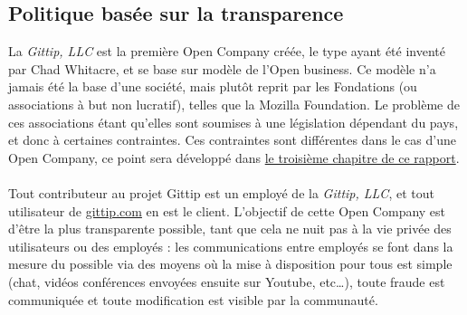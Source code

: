     \subsection{Politique basée sur la transparence}

La \emph{Gittip, LLC} est la première Open Company créée, le type ayant été
inventé par Chad Whitacre, et se base sur modèle de l'Open business. Ce modèle
n'a jamais été la base d'une société, mais plutôt reprit par les Fondations (ou
associations à but non lucratif), telles que la Mozilla Foundation. Le problème
de ces associations étant qu'elles sont soumises à une législation dépendant du
pays, et donc à certaines contraintes. Ces contraintes sont différentes dans le
cas d'une Open Company, ce point sera développé dans \hyperref[chapter3]{le
troisième chapitre de ce rapport}.

\paragraph{}
Tout contributeur au projet Gittip est un employé de la \emph{Gittip, LLC}, et
tout utilisateur de \url{gittip.com} en est le client. L'objectif de cette Open
Company est d'être la plus transparente possible, tant que cela ne nuit pas à
la vie privée des utilisateurs ou des employés : les communications entre
employés se font dans la mesure du possible via des moyens où la mise à
disposition pour tous est simple (chat, vidéos conférences envoyées ensuite sur
Youtube, etc\ldots), toute fraude est communiquée et toute modification est
visible par la communauté.
